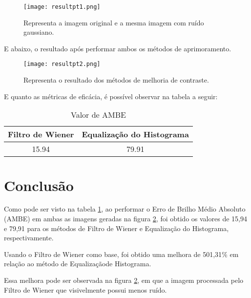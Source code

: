 \documentclass[conference]{IEEEtran}
\begin{document}
\begin{figure}[H]
    \centering
    \texttt{[image: resultpt1.png]}
    \caption{Representa a imagem original e a mesma imagem com ruído gaussiano.}
    \label{fig:label1}
\end{figure}

E abaixo, o resultado após performar ambos os métodos de aprimoramento.

\begin{figure}[H]
    \centering
    \texttt{[image: resultpt2.png]}
    \caption{Representa o resultado dos métodos de melhoria de contraste.}
    \label{fig:label2}
\end{figure}

E quanto as métricas de eficácia, é possível observar na tabela a seguir:

\begin{table}[H]
\renewcommand{\arraystretch}{1.3}
\caption{Valor de AMBE}
\label{table1}
\centering
\begin{tabular}{c||c}
\hline
\bfseries Filtro de Wiener &
\bfseries Equalização do Histograma \\
\hline\hline
15.94 & 79.91 \\
\hline
\end{tabular}
\end{table}

\section{Conclusão}

Como pode ser visto na tabela \ref{table1}, ao performar o Erro de Brilho Médio Absoluto (AMBE) em ambas as imagens geradas na figura \ref{fig:label2}, foi obtido os valores de 15,94 e 79,91 para os métodos de Filtro de Wiener  e Equalização do Histograma, respectivamente.

Usando o Filtro de Wiener como base, foi obtido uma melhora de 501,31\(\%\) em relação ao método de Equalizaçãode Histograma. 

Essa melhora pode ser observada na figura \ref{fig:label2}, em que a imagem processada pelo Filtro de Wiener que visivelmente possui menos ruído.
\end{document}
